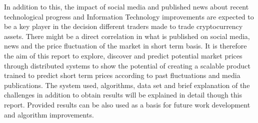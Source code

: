 In addition to this, the impact of social media and published news about recent technological progress and Information Technology improvements are expected to be a key player in the decision different traders made to trade cryptocurrency assets. There might be a direct correlation in what is published on social media, news and the price fluctuation of the market in short term basis. It is therefore the aim of this report to explore, discover and predict potential market prices through distributed systems to show the potential of creating a scalable product trained to predict short term prices according to past fluctuations and media publications. 
The system used, algorithms, data set and brief explanation of the challenges in addition to obtain results will be explained in detail though this report. Provided results can be also used as a basis for future work development and algorithm improvements.